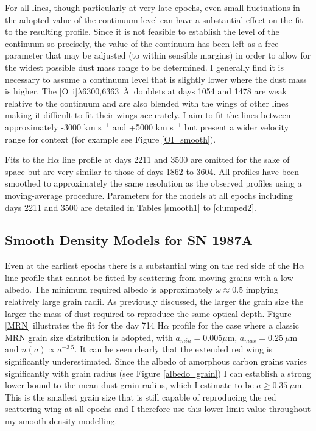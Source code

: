 For all lines, though particularly at very late epochs, even small 
fluctuations in the adopted value of the continuum level can have a 
substantial effect on the fit to the resulting profile.  Since it is not 
feasible to establish the level of the continuum so precisely, the value 
of the continuum has been left as a free parameter that may be adjusted 
(to within sensible margins) in order to allow for the widest possible 
dust mass range to be determined.  I generally find it is necessary to 
assume a continuum level that is slightly lower where the dust mass is 
higher.  The [O~{\sc i}]$\lambda$6300,6363~\AA\ doublets at days 1054 and 
1478 are weak relative to the continuum and are also blended with the 
wings of other lines making it difficult to fit their wings accurately.  
I aim to fit the lines between approximately -3000 km s$^{-1}$ and +5000 
km s$^{-1}$ but present a wider velocity range for context (for example 
see Figure \ref{OI_smooth}).


Fits to the H$\alpha$ line profile at days 2211 and 3500 are omitted for 
the sake of space but are very similar to those of days 1862 to 3604.  
All profiles have been smoothed to approximately the same resolution as 
the observed profiles using a moving-average procedure.  Parameters for 
the models at all epochs including days 2211 and 3500 are detailed in 
Tables \ref{smooth1} to \ref{clumped2}.


\subsection{Smooth Density Models for SN 1987A}
\label{smooth_models}

Even at the earliest epochs there is a substantial wing on the red side of 
the H$\alpha$ line profile that cannot be fitted by scattering from moving 
grains with a low albedo.  The minimum required albedo is approximately 
$\omega \approx 0.5$ implying relatively large grain radii.  As previously 
discussed, the larger the grain size the larger the mass of dust required 
to reproduce the same optical depth.  Figure \ref{MRN} illustrates the fit 
for the day 714 H$\alpha$ profile for the case where a classic MRN 
\citep{Mathis1977} grain size distribution is adopted, with $a_{min}=0.005 
\mu$m, $a_{max}=0.25~\mu$m and $n(a) \propto a^{-3.5}$.  It can be seen 
clearly that the extended red wing is significantly underestimated.  
Since the albedo of amorphous carbon grains varies significantly with 
grain radius (see Figure \ref{albedo_grain}) I can establish a strong 
lower bound to the mean dust grain radius, which I estimate to be $a \ge 
0.35~\mu$m.  This is the smallest grain size that is still capable of 
reproducing the red scattering wing at all epochs and I therefore use 
this lower limit value throughout my smooth density modelling.


